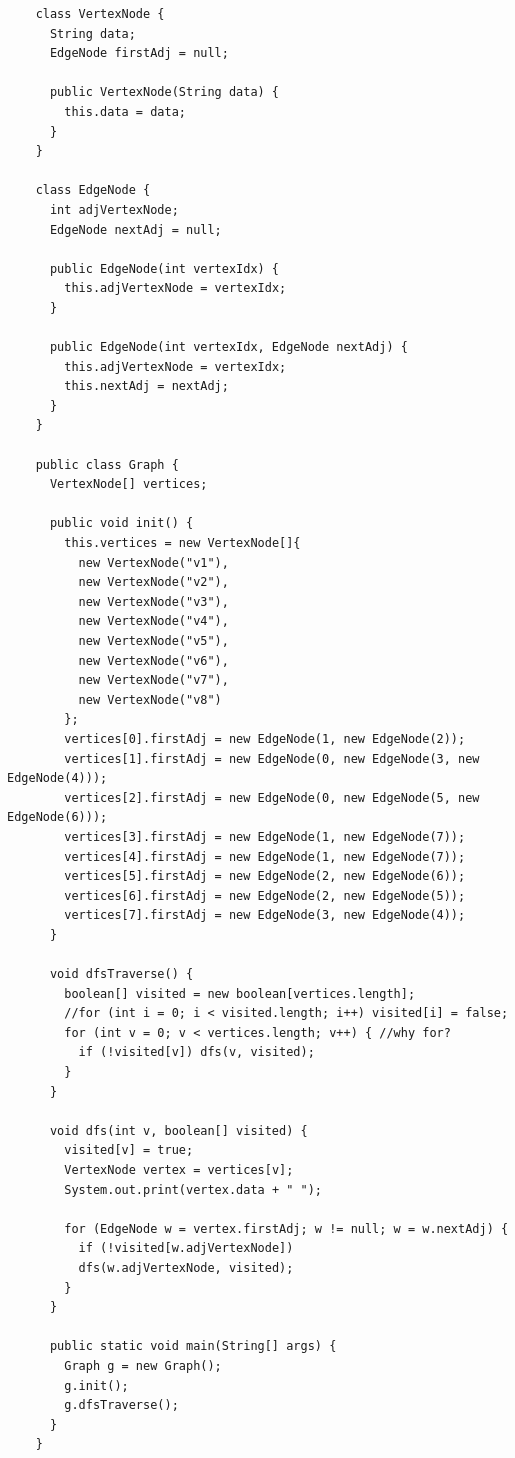 \begin{frame}
  \begin{verbatim}
    class VertexNode {
      String data;
      EdgeNode firstAdj = null;

      public VertexNode(String data) {
        this.data = data;
      }
    }

    class EdgeNode {
      int adjVertexNode;
      EdgeNode nextAdj = null;

      public EdgeNode(int vertexIdx) {
        this.adjVertexNode = vertexIdx;
      }

      public EdgeNode(int vertexIdx, EdgeNode nextAdj) {
        this.adjVertexNode = vertexIdx;
        this.nextAdj = nextAdj;
      }
    }
    
    public class Graph {
      VertexNode[] vertices;

      public void init() {
        this.vertices = new VertexNode[]{
          new VertexNode("v1"),
          new VertexNode("v2"),
          new VertexNode("v3"),
          new VertexNode("v4"),
          new VertexNode("v5"),
          new VertexNode("v6"),
          new VertexNode("v7"),
          new VertexNode("v8")
        };
        vertices[0].firstAdj = new EdgeNode(1, new EdgeNode(2));
        vertices[1].firstAdj = new EdgeNode(0, new EdgeNode(3, new EdgeNode(4)));
        vertices[2].firstAdj = new EdgeNode(0, new EdgeNode(5, new EdgeNode(6)));
        vertices[3].firstAdj = new EdgeNode(1, new EdgeNode(7));
        vertices[4].firstAdj = new EdgeNode(1, new EdgeNode(7));
        vertices[5].firstAdj = new EdgeNode(2, new EdgeNode(6));
        vertices[6].firstAdj = new EdgeNode(2, new EdgeNode(5));
        vertices[7].firstAdj = new EdgeNode(3, new EdgeNode(4));
      }
      
      void dfsTraverse() {
        boolean[] visited = new boolean[vertices.length];
        //for (int i = 0; i < visited.length; i++) visited[i] = false;
        for (int v = 0; v < vertices.length; v++) { //why for?
          if (!visited[v]) dfs(v, visited);
        }
      }

      void dfs(int v, boolean[] visited) {
        visited[v] = true;
        VertexNode vertex = vertices[v];
        System.out.print(vertex.data + " ");

        for (EdgeNode w = vertex.firstAdj; w != null; w = w.nextAdj) {
          if (!visited[w.adjVertexNode])
          dfs(w.adjVertexNode, visited);
        }
      }

      public static void main(String[] args) {
        Graph g = new Graph();
        g.init();
        g.dfsTraverse();
      }
    }
  \end{verbatim}
\end{frame}

